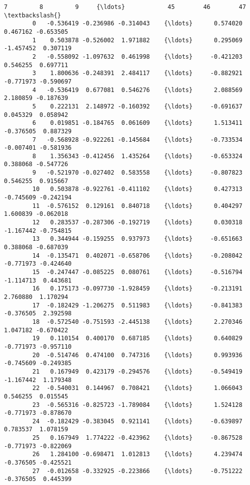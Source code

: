 \documentclass[11pt]{article}
\begin{document}
\begin{Verbatim}[commandchars=\\\{\}]
                   7         8         9     {\ldots}            45        46        47  \textbackslash{}
        0   -0.536419 -0.236986 -0.314043    {\ldots}      0.574020  0.467162 -0.653505   
        1    0.503878 -0.526002  1.971882    {\ldots}      0.295069 -1.457452  0.307119   
        2   -0.558092 -1.097632  0.461998    {\ldots}     -0.421203  0.546255  0.697711   
        3    1.800636 -0.248391  2.484117    {\ldots}     -0.882921 -0.771973 -0.590697   
        4   -0.536419  0.677081  0.546276    {\ldots}      2.088569  2.180859 -0.187639   
        5    0.222131  2.148972 -0.160392    {\ldots}     -0.691637  0.045329  0.058942   
        6    0.019851 -0.184765  0.061609    {\ldots}      1.513411 -0.376505  0.887329   
        7   -0.568928 -0.922261 -0.145684    {\ldots}     -0.733534 -0.007401 -0.581936   
        8    1.356343 -0.412456  1.435264    {\ldots}     -0.653324  0.388068 -0.547726   
        9   -0.521970 -0.027402  0.583558    {\ldots}     -0.807823  0.546255  0.915667   
        10   0.503878 -0.922761 -0.411102    {\ldots}      0.427313 -0.745609 -0.242194   
        11  -0.576152  0.129161  0.840718    {\ldots}      0.404297  1.600839 -0.062018   
        12   0.283537 -0.287306 -0.192719    {\ldots}      0.030318 -1.167442 -0.754815   
        13   0.344944 -0.159255  0.937973    {\ldots}     -0.651663  0.388068 -0.687039   
        14  -0.135471  0.402071 -0.658706    {\ldots}     -0.208042 -0.771973 -0.424640   
        15  -0.247447 -0.085225  0.080761    {\ldots}     -0.516794 -1.114713  0.443681   
        16   0.175173 -0.097730 -1.928459    {\ldots}     -0.213191  2.760880  1.170294   
        17  -0.182429 -1.206275  0.511983    {\ldots}     -0.841383 -0.376505  2.392598   
        18  -0.572540 -0.751593 -2.445138    {\ldots}      2.270346  1.047182 -0.670422   
        19   0.110154  0.400170  0.687185    {\ldots}      0.640829 -0.771973 -0.957110   
        20  -0.514746  0.474100  0.747316    {\ldots}      0.993936 -0.745609 -0.249385   
        21   0.167949  0.423179 -0.294576    {\ldots}     -0.549419 -1.167442  1.179348   
        22  -0.540031  0.144967  0.708421    {\ldots}      1.066043  0.546255  0.015545   
        23  -0.565316 -0.825723 -1.789084    {\ldots}      1.524128 -0.771973 -0.878670   
        24  -0.182429 -0.383045  0.921141    {\ldots}     -0.639897  0.783537  1.078159   
        25   0.167949  1.774222 -0.423962    {\ldots}     -0.867528 -0.771973 -0.822069   
        26   1.284100 -0.698471  1.012813    {\ldots}      4.239474 -0.376505 -0.425521   
        27  -0.012658 -0.332925 -0.223866    {\ldots}     -0.751222 -0.376505  0.445399   

\end{Verbatim}
\end{document}

